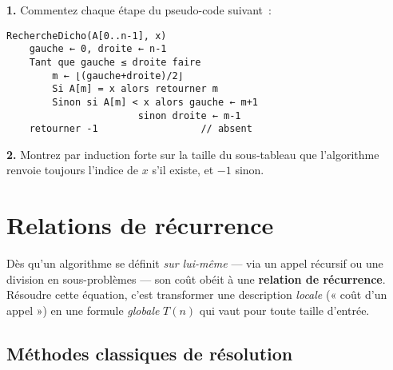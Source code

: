 \begin{exercice}
\leavevmode\par
\textbf{1.} Commentez chaque étape du pseudo-code suivant :
\begin{lstlisting}[mathescape=true]
RechercheDicho(A[0..n-1], x)
    gauche ← 0, droite ← n-1
    Tant que gauche ≤ droite faire
        m ← ⌊(gauche+droite)/2⌋
        Si A[m] = x alors retourner m
        Sinon si A[m] < x alors gauche ← m+1
                       sinon droite ← m-1
    retourner -1                  // absent
\end{lstlisting}
\textbf{2.} Montrez par induction forte sur la taille du sous‑tableau que
l’algorithme renvoie toujours l’indice de \(x\) s’il existe, et $-1$ sinon.
\end{exercice}

\section{Relations de récurrence}

Dès qu’un algorithme se définit \emph{sur lui-même} — via un appel récursif ou
une division en sous-problèmes — son coût obéit à une \textbf{relation de
récurrence}.  Résoudre cette équation, c’est transformer une description
\emph{locale} (« coût d’un appel ») en une formule \emph{globale}
\(T(n)\) qui vaut pour toute taille d’entrée.

\subsection{Méthodes classiques de résolution}

